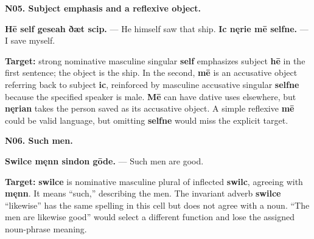 \par\begin{minipage}{\linewidth}\raggedright
\textbf{N05. Subject emphasis and a reflexive object.}

\textbf{Hē self geseah ðæt scip.} — He himself saw that ship. \textbf{Ic nęrie mē selfne.} — I save myself.

\textbf{Target:} strong nominative masculine singular \textbf{self} emphasizes subject \textbf{hē} in the first sentence; the object is the ship. In the second, \textbf{mē} is an accusative object referring back to subject \textbf{ic}, reinforced by masculine accusative singular \textbf{selfne} because the specified speaker is male. \textbf{Mē} can have dative uses elsewhere, but \textbf{nęrian} takes the person saved as its accusative object. A simple reflexive \textbf{mē} could be valid language, but omitting \textbf{selfne} would miss the explicit target.

\end{minipage}\par\addvspace{4pt}

\par\begin{minipage}{\linewidth}\raggedright
\textbf{N06. Such men.}

\textbf{Swilce męnn sindon gōde.} — Such men are good.

\textbf{Target:} \textbf{swilce} is nominative masculine plural of inflected \textbf{swilc}, agreeing with \textbf{męnn}. It means “such,” describing the men. The invariant adverb \textbf{swilce} “likewise” has the same spelling in this cell but does not agree with a noun. “The men are likewise good” would select a different function and lose the assigned noun-phrase meaning.

\end{minipage}\par\addvspace{4pt}

